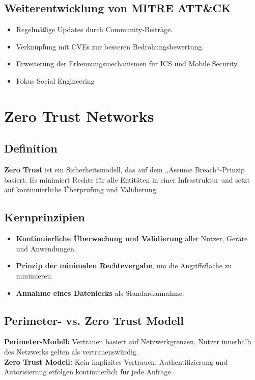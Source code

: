 \subsection{Weiterentwicklung von MITRE ATT\&CK}
\begin{itemize}
    \item Regelmäßige Updates durch Community-Beiträge.
    \item Verknüpfung mit CVEs zur besseren Bedrohungsbewertung.
    \item Erweiterung der Erkennungsmechanismen für ICS und Mobile Security.
    \item Fokus Social Engineering
\end{itemize}

\section{Zero Trust Networks}

\subsection{Definition}
\textbf{Zero Trust} ist ein Sicherheitsmodell, das auf dem „Assume Breach“-Prinzip basiert. Es minimiert Rechte für alle Entitäten in einer Infrastruktur und setzt auf kontinuierliche Überprüfung und Validierung.

\subsection{Kernprinzipien}
\begin{itemize}
    \item \textbf{Kontinuierliche Überwachung und Validierung} aller Nutzer, Geräte und Anwendungen.
    \item \textbf{Prinzip der minimalen Rechtevergabe}, um die Angriffsfläche zu minimieren.
    \item \textbf{Annahme eines Datenlecks} als Standardannahme.
\end{itemize}

\subsection{Perimeter- vs. Zero Trust Modell}
\textbf{Perimeter-Modell:} Vertrauen basiert auf Netzwerkgrenzen, Nutzer innerhalb des Netzwerks gelten als vertrauenswürdig.\\
\textbf{Zero Trust Modell:} Kein implizites Vertrauen, Authentifizierung und Autorisierung erfolgen kontinuierlich für jede Anfrage.


